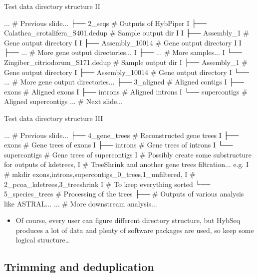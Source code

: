 \documentclass[compress, ucs, xelatex, 11pt, xcolor=x11names, aspectratio=169,
	hyperref={
		bookmarks=true,
		unicode=true,
		colorlinks=true,
		pdftitle={HybSeq course},
		plainpages=false,
		pdfauthor={Vojtech Zeisek},
		pdfsubject={Practical processing of HybSeq target enrichment sequencing data on computing grids like MetaCentrum},
		pdfcreator={XeLaTeX},
		pdfkeywords={BASH, command line, GNU, HybSeq, Linux, MetaCentrum, sequencing shell, target enrichment},
		linkcolor=Turquoise4, %
		anchorcolor=DodgerBlue4, %
		citecolor=DodgerBlue4, %
		filecolor=DodgerBlue4, %
		menucolor=Tan4, %
		urlcolor=DarkOliveGreen4, %
		pdftex},
	url={hyphens, lowtilde} %
	]{beamer}
\begin{document}
\begin{frame}[fragile]{Test data directory structure II}
	\begin{bashcode}
        ... # Previous slide...
        ├── 2_seqs # Outputs of HybPiper
        I   ├── Calathea_crotalifera_S401.dedup # Sample output dir
        I   I   ├── Assembly_1 # Gene output directory
        I   I   ├── Assembly_10014 # Gene output directory
        I   I   ├── ... # More gene output directories...
        I   ├── ... # More samples...
        I   └── Zingiber_citriodorum_S171.dedup # Sample output dir
        I       ├── Assembly_1 # Gene output directory
        I       ├── Assembly_10014 # Gene output directory
        I       └── ... # More gene output directories...
        ├── 3_aligned # Aligned contigs
        I   ├── exons # Aligned exons
        I   ├── introns # Aligned introns
        I   └── supercontigs # Aligned supercontigs
        ... # Next slide...
	\end{bashcode}
\end{frame}

\begin{frame}[fragile]{Test data directory structure III}
	\begin{bashcode}
        ... # Previous slide...
        ├── 4_gene_trees # Reconstructed gene trees
        I   ├── exons # Gene trees of exons
        I   ├── introns # Gene trees of introns
        I   └── supercontigs # Gene trees of supercontigs
        I   # Possibly create some substructure for outputs of kdetrees,
        I   # TreeShrink and another gene trees filtration... e.g.
        I   # mkdir {exons,introns,supercontigs}_{0_trees,1_unfiltered,
        I   #   2_pcoa_kdetrees,3_treeshrink}
        I   # To keep everything sorted
        └── 5_species_trees # Processing of the trees
            ├── # Outputs of various analysis like ASTRAL...
            ... # More downstream analysis...
	\end{bashcode}
	\begin{itemize}
		\item Of course, every user can figure different directory structure, but HybSeq produces a lot of data and plenty of software packages are used, so keep some logical structure\ldots
	\end{itemize}
\end{frame}

\subsection{Trimming and deduplication}
\end{document}
